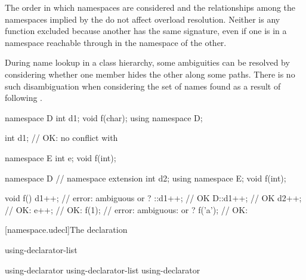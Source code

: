 \pnum
{}%
\begin{note}
The order in which namespaces are considered and the
relationships among the namespaces implied by the
 do not affect overload resolution.
Neither is any function excluded because another has the same
signature, even if one is in a namespace reachable through
 in the namespace of the other.
\begin{footnote}
During
name lookup in a class hierarchy, some ambiguities can be
resolved by considering whether one member hides the other along some
paths. There is no such disambiguation when
considering the set of names found as a result of following
.
\end{footnote}
\end{note}
\begin{example}
\begin{codeblock}
namespace D {
  int d1;
  void f(char);
}
using namespace D;

int d1;             // OK: no conflict with 

namespace E {
  int e;
  void f(int);
}

namespace D {       // namespace extension
  int d2;
  using namespace E;
  void f(int);
}

void f() {
  d1++;             // error: ambiguous  or ?
  ::d1++;           // OK
  D::d1++;          // OK
  d2++;             // OK: 
  e++;              // OK: 
  f(1);             // error: ambiguous:  or ?
  f('a');           // OK: 
}
\end{codeblock}
\end{example}
%

[namespace.udecl]{The  declaration}%

\begin{bnf}
\br
     using-declarator-list \terminal{;}
\end{bnf}

\begin{bnf}
\br
    using-declarator \br
    using-declarator-list \terminal{,} using-declarator 
\end{bnf}

